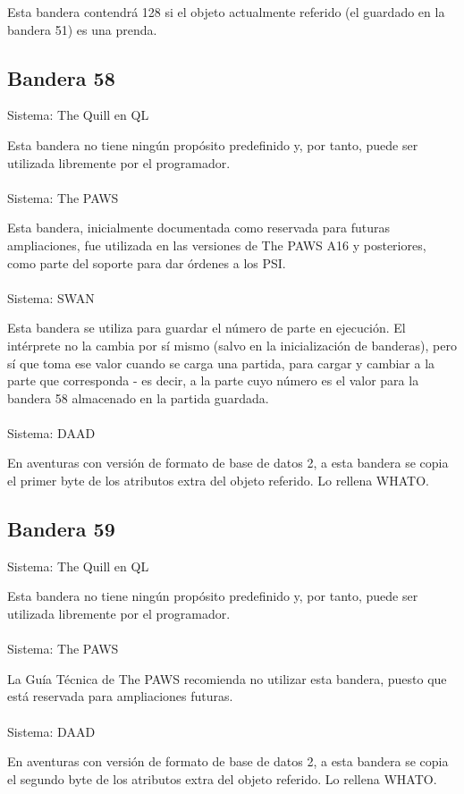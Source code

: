 \documentclass[11pt, a5paper]{article}
\newcommand{\quill}{\textsf{The Quill}\xspace}
\newcommand{\paw}{\textsf{The PAWS}\xspace}
\newcommand{\swan}{\textsf{SWAN}\xspace}
\newcommand{\daad}{\textsf{DAAD}\xspace}
\newcommand{\sistema}[1]{\noindent Sistema: #1 \nopagebreak}
\begin{document}
Esta bandera contendrá 128 si el objeto actualmente referido (el guardado en la bandera 51) es una prenda.

\subsection{Bandera 58}

\sistema{\quill en QL}

Esta bandera no tiene ningún propósito predefinido y, por tanto, puede ser utilizada libremente por el programador.
\\\ \\
\sistema{\paw}

Esta bandera, inicialmente documentada como reservada para futuras ampliaciones, fue utilizada en las versiones de \paw A16 y posteriores, como parte del soporte para dar órdenes a los PSI. \cite{PawsSupl}
\\\ \\
\sistema{\swan}

Esta bandera se utiliza para guardar el número de parte en ejecución. El intérprete no la cambia por sí mismo (salvo en la inicialización de banderas), pero sí que toma ese valor cuando se carga una partida, para cargar y cambiar a la parte que corresponda - es decir, a la parte cuyo número es el valor para la bandera 58 almacenado en la partida guardada.
\\\ \\
\sistema{\daad}

En aventuras con versión de formato de base de datos 2, a esta bandera se copia el primer byte de los atributos extra del objeto referido. Lo rellena WHATO.

\subsection{Bandera 59}

\sistema{\quill en QL}

Esta bandera no tiene ningún propósito predefinido y, por tanto, puede ser utilizada libremente por el programador.
\\\ \\
\sistema{\paw}

La Guía Técnica de \paw \cite{PawsZX} recomienda no utilizar esta bandera, puesto que está reservada para ampliaciones futuras.
\\\ \\
\sistema{\daad}

En aventuras con versión de formato de base de datos 2, a esta bandera se copia el segundo byte de los atributos extra del objeto referido. Lo rellena WHATO.
\end{document}
